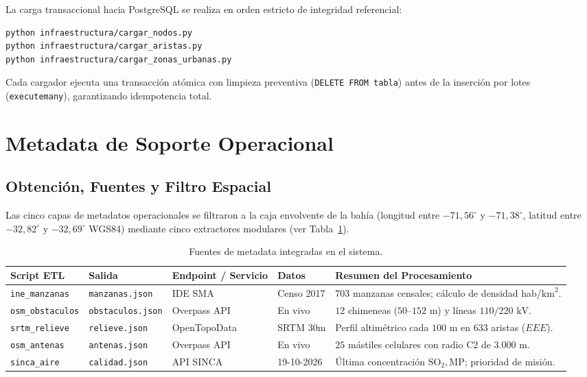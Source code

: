 \documentclass[letterpaper,12pt]{article}
\begin{document}
La carga transaccional hacia PostgreSQL se realiza en orden estricto de integridad referencial:
\begin{lstlisting}[language=bash]
python infraestructura/cargar_nodos.py
python infraestructura/cargar_aristas.py
python infraestructura/cargar_zonas_urbanas.py
\end{lstlisting}
Cada cargador ejecuta una transacción atómica con limpieza preventiva (\texttt{DELETE FROM tabla}) antes de la inserción por lotes (\texttt{executemany}), garantizando idempotencia total.

\section{Metadata de Soporte Operacional}
\label{sec:metadata}

\subsection{Obtención, Fuentes y Filtro Espacial}
\label{subsec:metadata_obtencion}

Las cinco capas de metadatos operacionales se filtraron a la caja envolvente de la bahía (longitud entre $-71{,}56^\circ$ y $-71{,}38^\circ$, latitud entre $-32{,}82^\circ$ y $-32{,}69^\circ$ WGS84) mediante cinco extractores modulares (ver Tabla~\ref{tab:metadata}).

\begin{table}[H]
\centering
\small
\caption{Fuentes de metadata integradas en el sistema.}
\label{tab:metadata}
\begin{tabularx}{\linewidth}{p{2.8cm}p{2.6cm}p{3.0cm}p{2.2cm}X}
\toprule
\textbf{Script ETL} & \textbf{Salida} & \textbf{Endpoint / Servicio} & \textbf{Datos} & \textbf{Resumen del Procesamiento} \\
\midrule
\texttt{ine\_manzanas} & \texttt{manzanas.json} & IDE SMA \cite{idesma} & Censo 2017 & $703$ manzanas censales; cálculo de densidad hab/$\text{km}^2$. \\
\addlinespace
\texttt{osm\_obstaculos} & \texttt{obstaculos.json} & Overpass API \cite{overpass} & En vivo & $12$ chimeneas ($50\text{--}152\text{ m}$) y líneas $110/220\text{ kV}$. \\
\addlinespace
\texttt{srtm\_relieve} & \texttt{relieve.json} & OpenTopoData \cite{opentopo} & SRTM 30m & Perfil altimétrico cada $100\text{ m}$ en $633$ aristas ($EEE$). \\
\addlinespace
\texttt{osm\_antenas} & \texttt{antenas.json} & Overpass API \cite{overpass} & En vivo & $25$ mástiles celulares con radio C2 de $3.000\text{ m}$. \\
\addlinespace
\texttt{sinca\_aire} & \texttt{calidad.json} & API SINCA \cite{sinca} & 19-10-2026 & Última concentración $\text{SO}_2, \text{MP}$; prioridad de misión. \\
\bottomrule
\end{tabularx}
\end{table}
\end{document}
